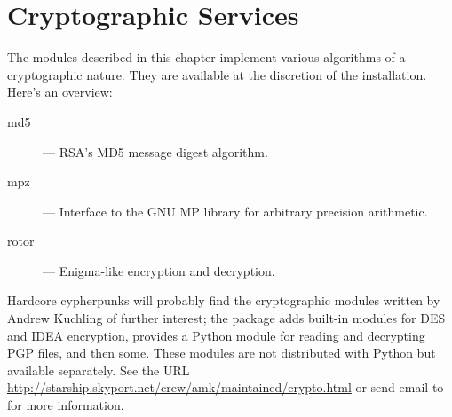 \chapter{Cryptographic Services}
\label{crypto}

The modules described in this chapter implement various algorithms of
a cryptographic nature.  They are available at the discretion of the
installation.  Here's an overview:

\begin{description}

\item[md5]
--- RSA's MD5 message digest algorithm.

\item[mpz]
--- Interface to the GNU MP library for arbitrary precision arithmetic.

\item[rotor]
--- Enigma-like encryption and decryption.

\end{description}

Hardcore cypherpunks will probably find the cryptographic modules
written by Andrew Kuchling of further interest; the package adds
built-in modules for DES and IDEA encryption, provides a Python module
for reading and decrypting PGP files, and then some.  These modules
are not distributed with Python but available separately.  See the URL
\url{http://starship.skyport.net/crew/amk/maintained/crypto.html} or
send email to  for more information.
